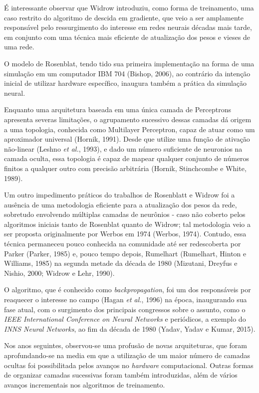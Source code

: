 \documentclass[]{article}
\begin{document}
É interessante observar que Widrow introduziu, como forma de
treinamento, uma caso restrito do algoritmo de descida em gradiente, que
veio a ser amplamente responsável pelo ressurgimento do interesse em
redes neurais décadas mais tarde, em conjunto com uma técnica mais
eficiente de atualização dos pesos e vieses de uma rede.

O modelo de Rosenblat, tendo tido sua primeira implementação na forma de
uma simulação em um computador IBM 704 (Bishop, 2006), ao contrário da
intenção inicial de utilizar hardware específico, inaugura também a
prática da simulação neural.

Enquanto uma arquitetura baseada em uma única camada de Perceptrons
apresenta severas limitações, o agrupamento sucessivo dessas camadas dá
origem a uma topologia, conhecida como Multilayer Perceptron, capaz de
atuar como um aproximador universal (Hornik, 1991). Desde que utilize
uma função de ativação não-linear (Leshno \emph{et al.}, 1993), e dado
um número suficiente de neuronios na camada oculta, essa topologia é
capaz de mapear qualquer conjunto de números finitos a qualquer outro
com precisão arbitrária (Hornik, Stinchcombe e White, 1989).

Um outro impedimento práticos do trabalhos de Rosenblatt e Widrow foi a
ausência de uma metodologia eficiente para a atualização dos pesos da
rede, sobretudo envolvendo múltiplas camadas de neurônios - caso não
coberto pelos algoritmos iniciais tanto de Rosenblat quanto de Widrow;
tal metodologia veio a ser proposta originalmente por Werbos em 1974
(Werbos, 1974). Contudo, essa técnica permaneceu pouco conhecida na
comunidade até ser redescoberta por Parker (Parker, 1985) e, pouco tempo
depois, Rumelhart (Rumelhart, Hinton e Williams, 1985) na segunda metade
da década de 1980 (Mizutani, Dreyfus e Nishio, 2000; Widrow e Lehr,
1990).

O algoritmo, que é conhecido como \emph{backpropagation}, foi um dos
responsáveis por reaquecer o interesse no campo (Hagan \emph{et al.},
1996) na época, inaugurando sua fase atual, com o surgimento dos
principais congressos sobre o assunto, como o \emph{IEEE International
Conference on Neural Networks} e periódicos, a exemplo do \emph{INNS
Neural Networks}, ao fim da década de 1980 (Yadav, Yadav e Kumar, 2015).

Nos anos seguintes, observou-se uma profusão de novas arquiteturas, que
foram aprofundando-se na media em que a utilização de um maior número de
camadas ocultas foi possibilitada pelos avanços no \emph{hardware}
computacional. Outras formas de organizar camadas sucessivas foram
também introduzidas, além de vários avanços incrementais nos algoritmos
de treinamento.
\end{document}
